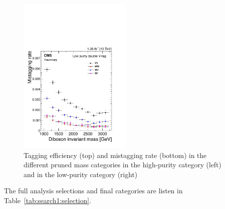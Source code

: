\begin{figure}[h!]
\includegraphics[width=0.49\textwidth]{figures/analysis/search1/AN-15-211/QCD_LP_VV_MistaggingRateEff.pdf}
\caption{Tagging efficiency (top) and mistagging rate (bottom) in the different pruned mass categories in the high-purity category (left) and in the low-purity category (right)}
\label{fig:search1:sigeff}
\end{figure}

The full analysis selections and final categories are listen in Table~\ref{tab:search1:selection}.

